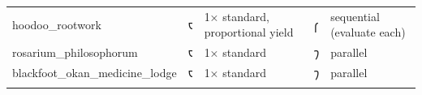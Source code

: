 \documentclass[12pt,a4paper]{article}
\begin{document}
\begin{longtable}[]{@{}lllll@{}}
\begin{minipage}[t]{0.17\columnwidth}\raggedright
hoodoo\_rootwork\strut
\end{minipage} & \begin{minipage}[t]{0.17\columnwidth}\raggedright
𐑱\strut
\end{minipage} & \begin{minipage}[t]{0.17\columnwidth}\raggedright
1× standard, proportional yield\strut
\end{minipage} & \begin{minipage}[t]{0.17\columnwidth}\raggedright
𐑝\strut
\end{minipage} & \begin{minipage}[t]{0.17\columnwidth}\raggedright
sequential (evaluate each)\strut
\end{minipage}\tabularnewline
\begin{minipage}[t]{0.17\columnwidth}\raggedright
rosarium\_philosophorum\strut
\end{minipage} & \begin{minipage}[t]{0.17\columnwidth}\raggedright
𐑱\strut
\end{minipage} & \begin{minipage}[t]{0.17\columnwidth}\raggedright
1× standard\strut
\end{minipage} & \begin{minipage}[t]{0.17\columnwidth}\raggedright
𐑠\strut
\end{minipage} & \begin{minipage}[t]{0.17\columnwidth}\raggedright
parallel\strut
\end{minipage}\tabularnewline
\begin{minipage}[t]{0.17\columnwidth}\raggedright
blackfoot\_okan\_medicine\_lodge\strut
\end{minipage} & \begin{minipage}[t]{0.17\columnwidth}\raggedright
𐑱\strut
\end{minipage} & \begin{minipage}[t]{0.17\columnwidth}\raggedright
1× standard\strut
\end{minipage} & \begin{minipage}[t]{0.17\columnwidth}\raggedright
𐑠\strut
\end{minipage} & \begin{minipage}[t]{0.17\columnwidth}\raggedright
parallel\strut
\end{minipage}\tabularnewline
\begin{minipage}[t]{0.17\columnwidth}\raggedright

\end{minipage}
\end{longtable}
\end{document}
